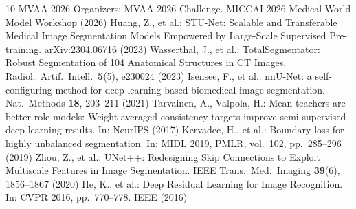 \documentclass[runningheads]{llncs}
\begin{document}
\begin{thebibliography}{10}
MVAA 2026 Organizers: MVAA 2026 Challenge. MICCAI 2026 Medical World Model Workshop (2026)
Huang, Z., et al.: STU-Net: Scalable and Transferable Medical Image Segmentation Models Empowered by Large-Scale Supervised Pre-training. arXiv:2304.06716 (2023)
Wasserthal, J., et al.: TotalSegmentator: Robust Segmentation of 104 Anatomical Structures in CT Images. Radiol.\ Artif.\ Intell.\ \textbf{5}(5), e230024 (2023)
Isensee, F., et al.: nnU-Net: a self-configuring method for deep learning-based biomedical image segmentation. Nat.\ Methods \textbf{18}, 203--211 (2021)
Tarvainen, A., Valpola, H.: Mean teachers are better role models: Weight-averaged consistency targets improve semi-supervised deep learning results. In: NeurIPS (2017)
Kervadec, H., et al.: Boundary loss for highly unbalanced segmentation. In: MIDL 2019, PMLR, vol.\ 102, pp.\ 285--296 (2019)
Zhou, Z., et al.: UNet++: Redesigning Skip Connections to Exploit Multiscale Features in Image Segmentation. IEEE Trans.\ Med.\ Imaging \textbf{39}(6), 1856--1867 (2020)
He, K., et al.: Deep Residual Learning for Image Recognition. In: CVPR 2016, pp.\ 770--778. IEEE (2016)
\end{thebibliography}
\end{document}
